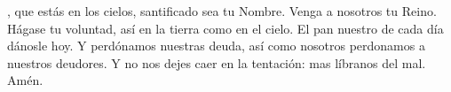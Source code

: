 , que estás en los cielos, santificado sea tu Nombre. Venga a nosotros tu Reino.
Hágase tu voluntad, así en la tierra como en el cielo. El pan nuestro de cada día dánosle hoy.
Y perdónamos nuestras deuda, así como nosotros perdonamos a nuestros deudores.
Y no nos dejes caer en la tentación: mas líbranos del mal. Amén.